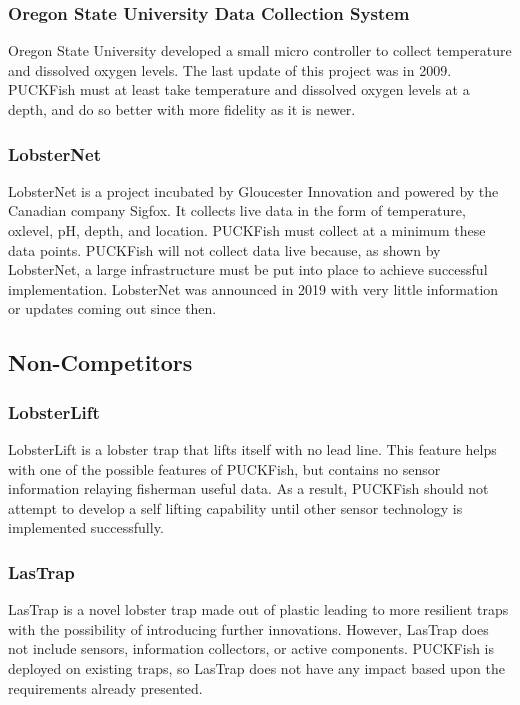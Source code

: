 \documentclass[12pt]{article}         %
\begin{document}
\subsubsection{Oregon State University Data Collection System}
\par Oregon State University developed a small micro controller to collect temperature and dissolved oxygen levels. The last update of this project was in 2009. PUCKFish must at least take temperature and dissolved oxygen levels at a depth, and do so better with more fidelity as it is newer.

\subsubsection{LobsterNet}
\par LobsterNet is a project incubated by Gloucester Innovation and powered by the Canadian company Sigfox. It collects live data in the form of temperature, oxlevel, pH, depth, and location. PUCKFish must collect at a minimum these data points. PUCKFish will not collect data live because, as shown by LobsterNet, a large infrastructure must be put into place to achieve successful implementation. LobsterNet was announced in 2019 with very little information or updates coming out since then.

\subsection{Non-Competitors}
\subsubsection{LobsterLift}
\par LobsterLift is a lobster trap that lifts itself with no lead line. This feature helps with one of the possible features of PUCKFish, but contains no sensor information relaying fisherman useful data. As a result, PUCKFish should not attempt to develop a self lifting capability until other sensor technology is implemented successfully.

\subsubsection{LasTrap}
\par LasTrap is a novel lobster trap made out of plastic leading to more resilient traps with the possibility of introducing further innovations. However, LasTrap does not include sensors, information collectors, or active components. PUCKFish is deployed on existing traps, so LasTrap does not have any impact based upon the requirements already presented.
\end{document}
